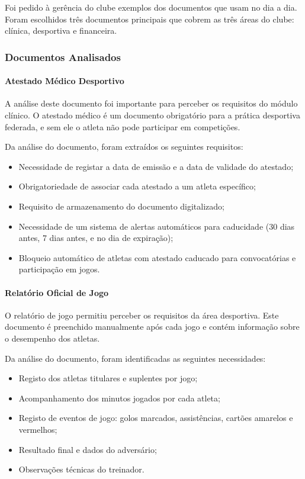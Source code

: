 Foi pedido à gerência do clube exemplos dos documentos que usam no dia a dia. Foram escolhidos três documentos principais que cobrem as três áreas do clube: clínica, desportiva e financeira.

\subsubsection{Documentos Analisados}

\paragraph{Atestado Médico Desportivo}

A análise deste documento foi importante para perceber os requisitos do módulo clínico. O atestado médico é um documento obrigatório para a prática desportiva federada, e sem ele o atleta não pode participar em competições.

Da análise do documento, foram extraídos os seguintes requisitos:
\begin{itemize}
    \item Necessidade de registar a data de emissão e a data de validade do atestado;
    \item Obrigatoriedade de associar cada atestado a um atleta específico;
    \item Requisito de armazenamento do documento digitalizado;
    \item Necessidade de um sistema de alertas automáticos para caducidade (30 dias antes, 7 dias antes, e no dia de expiração);
    \item Bloqueio automático de atletas com atestado caducado para convocatórias e participação em jogos.
\end{itemize}



\paragraph{Relatório Oficial de Jogo}

O relatório de jogo permitiu perceber os requisitos da área desportiva. Este documento é preenchido manualmente após cada jogo e contém informação sobre o desempenho dos atletas.

Da análise do documento, foram identificadas as seguintes necessidades:
\begin{itemize}
    \item Registo dos atletas titulares e suplentes por jogo;
    \item Acompanhamento dos minutos jogados por cada atleta;
    \item Registo de eventos de jogo: golos marcados, assistências, cartões amarelos e vermelhos;
    \item Resultado final e dados do adversário;
    \item Observações técnicas do treinador.
\end{itemize}

